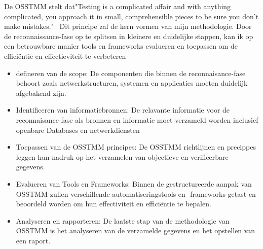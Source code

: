 De OSSTMM stelt dat"Testing is a complicated affair and with anything complicated, you approach it in small, comprehensible pieces to be sure you don’t make mistakes."~\autocite{Herzog}
Dit principe zal de kern vormen van mijn methodologie. 
Door de reconnaissance-fase op te splitsen in kleinere en duidelijke stappen, kan ik op een betrouwbare manier tools en frameworks evalueren en toepassen om de efficiëntie en effectieviteit te verbeteren

\begin{itemize}
    \item defineren van de scope: 
    De componenten die binnen de reconnaisance-fase behoort zoals netwerkstructuren, systemen en applicaties moeten duidelijk afgebakend zijn.
    \item Identificeren van informatiebronnen:
    De relavante informatie voor de reconnaisance-fase als bronnen en informatie moet verzameld worden inclusief openbare Databases en netwerkdiensten 
    \item Toepassen van de OSSTMM principes:
    De OSSTMM richtlijnen en precippes leggen hun nadruk op het verzamelen van objectieve en verifieerbare gegevens.
    \item Evalueren van Tools en Frameworks:
    Binnen de gestructureerde aanpak van OSSTMM zullen verschillende automatiseringstools en -frameworks getast en beoordeld worden om hun effectiviteit en efficiëntie te bepalen.
    \item Analyseren en rapporteren:
    De laatste stap van de methodologie van OSSTMM is het analyseren van de verzamelde gegevens en het opstellen van een raport.
\end{itemize}




